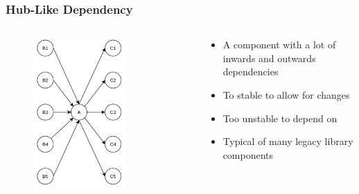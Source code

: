 \documentclass[dvipsnames, 10pt]{beamer}
\begin{document}
\begin{frame}
  \frametitle{Hub-Like Dependency}
  \begin{columns}
    \begin{column}{0.5\textwidth}
      \begin{figure}
        \begin{center}
          \includegraphics[width=0.7\textwidth]{figures/architectural-smells/hub-like-dependency.png}
        \end{center}
      \end{figure}
    \end{column}
    \begin{column}{0.5\textwidth}
      \begin{itemize}
        \item A component with a lot of inwards and outwards dependencies
        \item To stable to allow for changes
        \item Too unstable to depend on
        \item Typical of many legacy library components
      \end{itemize}
    \end{column}
  \end{columns}
\end{frame}
\end{document}
